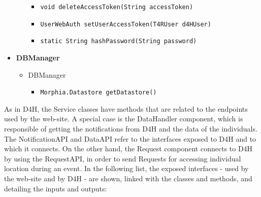 \documentclass[a4paper, hidelinks, 12pt]{report}
\begin{document}
\begin{itemize}
\begin{itemize}
\begin{itemize}
						\item{\verb|void deleteAccessToken(String accessToken)|}
						\item{\verb|UserWebAuth setUserAccessToken(T4RUser d4HUser)|}
						\item{\verb|static String hashPassword(String password)|}
					\end{itemize}
			\end{itemize}
		\item{\textbf{DBManager}}
			\begin{itemize}
				\item{DBManager}
					\begin{itemize}
						\item{\verb|Morphia.Datastore getDatastore()|}
					\end{itemize}
			\end{itemize}
	\end{itemize}
	As in D4H, the Service classes have methods that are related to the endpoints used by the web-site. A special case is the DataHandler component, which is responsible of getting the notifications from D4H and the data of the individuals. The  NotificationAPI and DataAPI refer to the interfaces exposed to D4H and to which it connects. On the other hand, the Request component connects to D4H by using the RequestAPI, in order to send Requests for accessing individual location during an event. In the following list, the exposed interfaces - used by the web-site and by D4H - are shown, linked with the classes and methods, and detailing the inputs and outputs:
	
\end{document}
